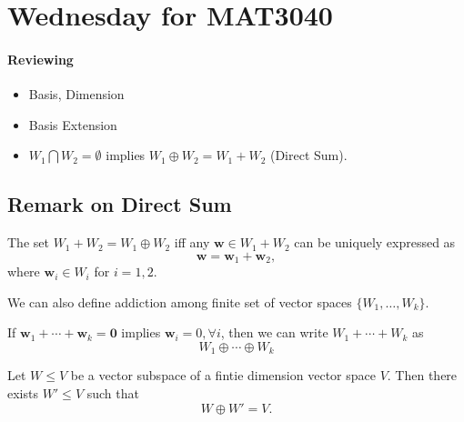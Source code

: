 
\section{Wednesday for MAT3040}
\paragraph{Reviewing}
\begin{itemize}
\item
Basis, Dimension
\item
Basis Extension
\item
$W_1\bigcap W_2=\emptyset$ implies $W_1\oplus W_2=W_1+W_2$ (Direct Sum).
\end{itemize}

\subsection{Remark on Direct Sum}

\begin{proposition}
The set $W_1+W_2=W_1\oplus W_2$ iff 
any $\bm w\in W_1+W_2$ can be uniquely expressed as 
\[
\bm w=\bm w_1+\bm w_2,
\]
where $\bm w_i\in W_i$ for $i=1,2$.
\end{proposition}

\begin{remark}
We can also define addiction among finite set of vector spaces $\{W_1,\dots,W_k\}$.

If $\bm w_1+\cdots+\bm w_k=\bm0$ implies $\bm w_i=0,\forall i$, then we can write $W_1+\cdots+W_k$ as
\[
W_1\oplus\cdots\oplus W_k
\]
\end{remark}
\begin{proposition}[Complementation]\label{Pro:2:14}
Let $W\le V$ be a vector subspace of a 
fintie dimension vector space $V$. 
Then there exists $W'\le V$ such that
\[
W\oplus W'=V.
\]
\end{proposition}

